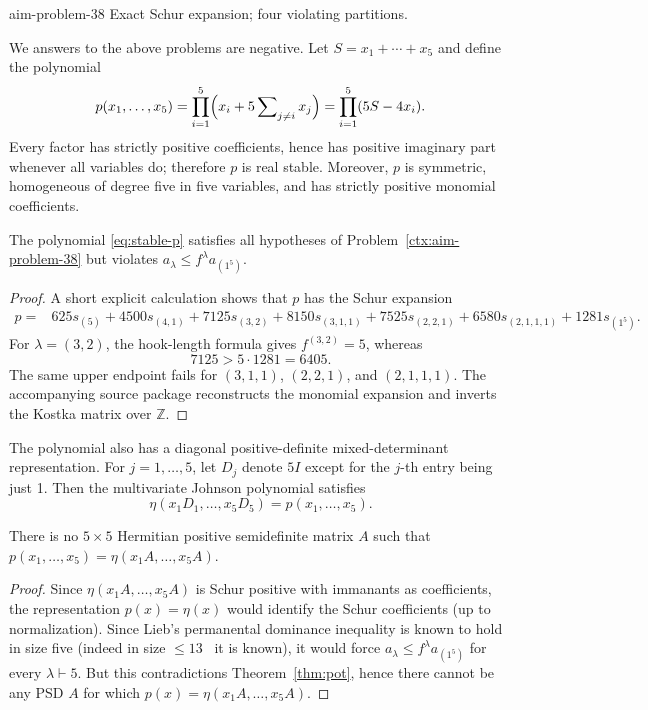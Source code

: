 \begin{cxcertificate}{aim-problem-38}
Exact Schur expansion; four violating partitions.
\end{cxcertificate}

\begin{cxrefutation}
We answers to the above problems are negative. Let $S=x_1+\cdots+x_5$ and define the polynomial
\begin{equation}\label{eq:stable-p}
p(x_1,\ldots,x_5)=\prod_{i=1}^5\Bigl(x_i+5\sum\nolimits_{j\ne i}x_j\Bigr)=\prod_{i=1}^5(5S-4x_i).
\end{equation}
Every factor has strictly positive coefficients, hence has positive imaginary part whenever all variables do; therefore $p$ is real stable. Moreover, $p$ is symmetric, homogeneous of degree five in five variables, and has strictly positive monomial coefficients. %

\begin{theorem}\label{thm:pot}
The polynomial \eqref{eq:stable-p} satisfies all hypotheses of Problem~\ref{ctx:aim-problem-38} but violates $a_\lambda\le f^\lambda a_{(1^5)}$.
\end{theorem}
\begin{proof}
A short explicit calculation shows that $p$ has the Schur expansion
\begin{align*}
p={}&625s_{(5)}+4500s_{(4,1)}+7125s_{(3,2)}+8150s_{(3,1,1)}+7525s_{(2,2,1)}+6580s_{(2,1,1,1)}+1281s_{(1^5)}.
\end{align*}
For $\lambda=(3,2)$, the hook-length formula gives $f^{(3,2)}=5$, whereas
\[
7125>5\cdot1281=6405.
\]
The same upper endpoint fails for $(3,1,1)$, $(2,2,1)$, and $(2,1,1,1)$.  The accompanying source package reconstructs the monomial expansion and inverts the Kostka matrix over $\mathbb Z$.
\end{proof}

The polynomial also has a diagonal positive-definite mixed-determinant representation.  For $j=1,\ldots,5$, let $D_j$ denote $5I$ except for the $j$-th entry being just 1. 
Then the multivariate Johnson polynomial satisfies
\[
\eta(x_1D_1,\ldots,x_5D_5)=p(x_1,\ldots,x_5).
\]

\begin{theorem}\label{thm:common-A}
There is no $5\times5$ Hermitian positive semidefinite matrix $A$ such that $p(x_1,\ldots,x_5)=\eta(x_1A,\ldots,x_5A)$.
\end{theorem}
\begin{proof}
Since $\eta(x_1A,\ldots,x_5A)$ is Schur positive with immanants as coefficients, the representation $p(x)=\eta(x)$ would identify the Schur coefficients (up to normalization). Since Lieb's permanental dominance inequality is known to hold in size five (indeed in size $\le 13$~\cite{Wanless2022} it is known), it would force
$a_\lambda\le f^\lambda a_{(1^5)}$ for every $\lambda\vdash5$. But this contradictions Theorem~\ref{thm:pot}, hence there cannot be any PSD $A$ for which $p(x)=\eta(x_1A,\ldots,x_5A)$.
\end{proof}


\end{cxrefutation}
